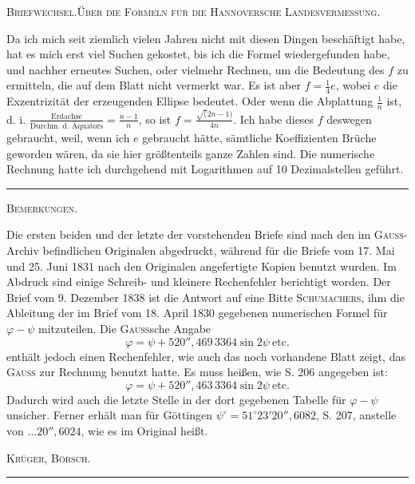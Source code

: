\par\clearpage
{}\hfill{\footnotesize\textsc{Briefwechsel.\quad Über die Formeln für die Hannoversche Landesvermessung.}}\par\medskip
Da ich mich seit ziemlich vielen Jahren nicht mit diesen Dingen beschäftigt habe, hat es mich erst viel Suchen gekostet, bis ich die Formel wiedergefunden habe, und nachher erneutes Suchen, oder vielmehr Rechnen, um die Bedeutung des \(f\) zu ermitteln, die auf dem Blatt nicht vermerkt war. Es ist aber \(f=\frac14e\), wobei \(e\) die Exzentrizität der erzeugenden Ellipse bedeutet. Oder wenn die Abplattung \(\frac1n\) ist, d. i. \(\frac{\text{Erdachse}}{\text{Durchm. d. Äquators}}=\frac{n-1}n\), so ist \(f=\frac{\surd(2n-1)}{4n}\). Ich habe dieses \(f\) deswegen gebraucht, weil, wenn ich \(e\) gebraucht hätte, sämtliche Koeffizienten Brüche geworden wären, da sie hier größtenteils ganze Zahlen sind. Die numerische Rechnung hatte ich durchgehend mit Logarithmen auf 10 Dezimalstellen geführt.
\begin{center}\rule{3cm}{.4pt}\end{center}
\bigskip
\begin{center}\textsc{Bemerkungen.}\end{center}
\begingroup\footnotesize
Die ersten beiden und der letzte der vorstehenden Briefe sind nach den im \textsc{Gauss}-Archiv befindlichen Originalen abgedruckt, während für die Briefe vom 17. Mai und 25. Juni 1831 nach den Originalen angefertigte Kopien benutzt wurden. Im Abdruck sind einige Schreib- und kleinere Rechenfehler berichtigt worden. Der Brief vom 9. Dezember 1838 ist die Antwort auf eine Bitte \textsc{Schumachers}, ihm die Ableitung der im Brief vom 18. April 1830 gegebenen numerischen Formel für \(\varphi-\psi\) mitzuteilen. Die \textsc{Gauss}sche Angabe
\[
\varphi=\psi+520''{,}469\,3364\sin2\psi\ \text{etc.}
\]
\noindent enthält jedoch einen Rechenfehler, wie auch das noch vorhandene Blatt zeigt, das \textsc{Gauss} zur Rechnung benutzt hatte. Es muss heißen, wie S. 206 angegeben ist:
\[
\varphi=\psi+520''{,}463\,3364\sin2\psi\ \text{etc.}
\]
\noindent Dadurch wird auch die letzte Stelle in der dort gegebenen Tabelle für \(\varphi-\psi\) unsicher. Ferner erhält man für Göttingen \(\psi^\circ=51^\circ23'20''{,}6082\), S. 207, anstelle von \(\ldots20''{,}6024\), wie es im Original heißt.
\par\noindent\hfill\textsc{Krüger, Börsch.}\par
\endgroup
\vspace{1.8cm}\begin{center}\rule{4cm}{.4pt}\end{center}

